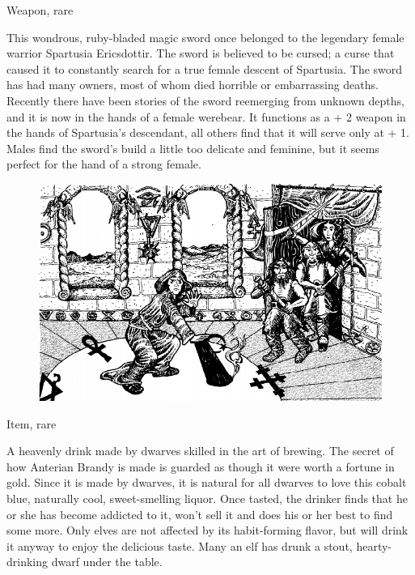 \documentclass[palace_of_the_silver_princess]{subfiles}
\begin{document}
{Weapon, rare}

This wondrous, ruby-bladed magic sword once belonged to the legendary
female warrior Spartusia Ericsdottir. The sword is believed to be
cursed; a curse that caused it to constantly search for a true female
descent of Spartusia. The sword has had many owners, most of whom died
horrible or embarrassing deaths. Recently there have been stories of
the sword reemerging from unknown depths, and it is now in the hands of
a female werebear. It functions as a + 2 weapon in the hands of
Spartusia’s descendant, all others find that it will serve only at + 1.
Males find the sword’s build a little too delicate and feminine, but it
seems perfect for the hand of a strong female.

\begin{figure}[!ht]
    \includegraphics[width=\textwidth]{img/cleric.png}
\end{figure}

{Item, rare}

A heavenly drink made by dwarves skilled in the art of brewing. The
secret of how Anterian Brandy is made is guarded as though it were worth
a fortune in gold. Since it is made by dwarves, it is natural for all
dwarves to love this cobalt blue, naturally cool, sweet-smelling liquor.
Once tasted, the drinker finds that he or she has become addicted to it,
won’t sell it and does his or her best to find some more. Only elves are
not affected by its habit-forming flavor, but will drink it anyway to
enjoy the delicious taste. Many an elf has drunk a stout,
hearty-drinking dwarf under the table.
\end{document}
